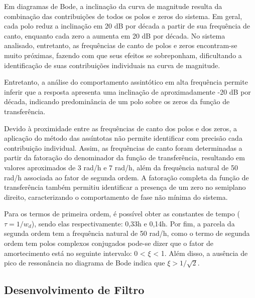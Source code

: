 Em diagramas de Bode, a inclinação da curva de magnitude resulta da combinação das contribuições de todos os polos e zeros do sistema.
Em geral, cada polo reduz a inclinação em 20 dB por década a partir de sua frequência de canto, enquanto cada zero a aumenta em 20 dB por década.
No sistema analisado, entretanto, as frequências de canto de polos e zeros encontram-se muito próximas, fazendo com que seus efeitos se sobreponham, dificultando a identificação de suas contribuições individuais na curva de magnitude.

Entretanto, a análise do comportamento assintótico em alta frequência permite inferir que a resposta apresenta uma inclinação de aproximadamente -20 dB por década, indicando predominância de um polo sobre os zeros da função de transferência.


Devido à proximidade entre as frequências de canto dos polos e dos zeros, a aplicação do método das assíntotas não permite identificar com precisão cada contribuição individual.
Assim, as frequências de canto foram determinadas a partir da fatoração do denominador da função de transferência, resultando em valores aproximados de 3 rad/h e 7 rad/h, além da frequência natural de 50 rad/h associada ao fator de segunda ordem. A fatoração completa da função de transferência também permitiu identificar a presença de um zero no semiplano direito, caracterizando o comportamento de fase não mínima do sistema.

Para os termos de primeira ordem, é possível obter as constantes de tempo  ($\tau = 1/w_d$), sendo elas respectivamente: 0,33h e 0,14h.
Por fim, a parcela da segunda ordem tem a frequência natural de 50 rad/h, como o termo de segunda ordem tem polos complexos conjugados pode-se dizer que o fator de amortecimento está no seguinte intervalo: 0 < $\xi$ < 1. Além disso, a ausência de pico de ressonância no diagrama de Bode indica que $\xi > 1/\sqrt{2}$. %

\subsection{Desenvolvimento de Filtro}

